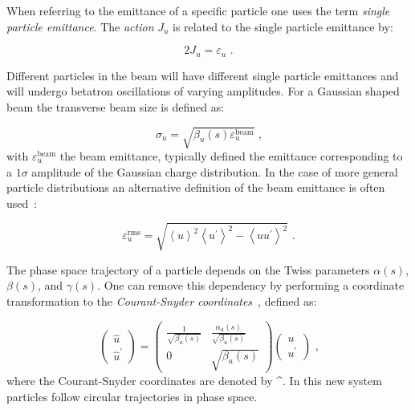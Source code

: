 When referring to the emittance of a specific particle one uses the term \emph{single particle emittance}.
The \emph{action} \(J_u\) is related to the single particle emittance by:

\begin{equation}
    2 J_u = \varepsilon_u \text{ .}
    \label{equation:single_particle_action}
\end{equation}

Different particles in the beam will have different single particle emittances and will undergo betatron oscillations of varying amplitudes.
For a Gaussian shaped beam the transverse beam size is defined as:

\begin{equation}
    \sigma_u = \sqrt{\beta_u(s) \varepsilon_u^{\mathrm{beam}}} \text{ ,}
    \label{equation:gaussian_beam_transverse_beam_size}
\end{equation}
with \(\varepsilon_u^{\mathrm{beam}}\) the beam emittance, typically defined the emittance corresponding to a \(1 \sigma\) amplitude of the Gaussian charge distribution.
In the case of more general particle distributions an alternative definition of the beam emittance is often used~\cite{CERN:Muller:Beam_Matter_Covariance_Matrix_Emittance, CERN:Buon:CAS_Beam_Phase_Space_Emittance}:

\begin{equation}
    \varepsilon_u^{\mathrm{rms}} = \sqrt{\left\langle u \right\rangle^{2} \left\langle u^{\prime} \right\rangle^{2} - \left\langle uu^{\prime} \right\rangle^{2}} \text{ .}
    \label{equation:beam_emittance_general}
\end{equation}

The phase space trajectory of a particle depends on the Twiss parameters $\alpha(s)$, $\beta(s)$, and $\gamma(s)$.
One can remove this dependency by performing a coordinate transformation to the \emph{Courant-Snyder coordinates}~\cite{BOOK:Bazzani:Normal_Form_Approach_Betatron_Motion}, defined as:

\begin{equation}
    \left(\begin{array}{c}
    \hat{u} \\
    \hat{u}^{\prime}
    \end{array}\right) = \left(\begin{array}{cc}
    \frac{1}{\sqrt{\beta_{u}(s)}} & \frac{\alpha_{u}(s)}{\sqrt{\beta_{u}(s)}} \\
    0 & \sqrt{\beta_{u}(s)}
    \end{array}\right)\left(\begin{array}{c}
    u \\
    u^{\prime}
    \end{array}\right) \text{ ,}
    \label{equation:courant_snyder_coordinates}
\end{equation}
where the Courant-Snyder coordinates are denoted by \^{}.
In this new system particles follow circular trajectories in phase space.

